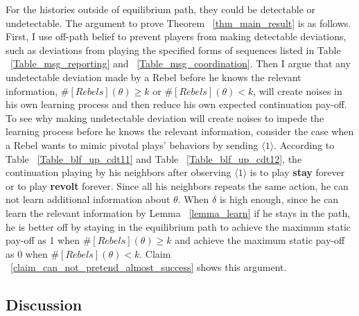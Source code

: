 \documentclass[12pt,letterpaper]{article}
\theoremstyle{definition}
\theoremstyle{remark}
\theoremstyle{claim}
\begin{document}
For the histories outside of equilibrium path, they could be detectable or undetectable. The argument to prove Theorem ~\ref{thm_main_result} is as follows. First, I use off-path belief to prevent players from making detectable deviations, such as deviations from playing the specified forms of sequences listed in Table ~\ref{Table_msg_reporting} and ~\ref{Table_msg_coordination}. Then I argue that any undetectable deviation made by a Rebel before he knows the relevant information, $\#[Rebels](\theta)\geq k$ or $\#[Rebels](\theta)< k$, will create noises in his own learning process and then reduce his own expected continuation pay-off.  To see why making undetectable deviation will create noises to impede the learning process before he knows the relevant information, consider the case when a Rebel wants to mimic pivotal plays' behaviors by sending $\langle 1 \rangle$. According to Table ~\ref{Table_blf_up_cdt11} and Table ~\ref{Table_blf_up_cdt12}, the continuation playing by his neighbors after observing $\langle 1 \rangle$ is to play \textbf{stay} forever or to play \textbf{revolt} forever. Since all his neighbors repeats the same action, he can not learn additional information about $\theta$. When $\delta$ is high enough, since he can learn the relevant information by Lemma ~\ref{lemma_learn} if he stays in the path, he is better off by staying in the equilibrium path to achieve the maximum static pay-off as 1 when $\#[Rebels](\theta)\geq k$ and achieve the maximum static pay-off as 0 when $\#[Rebels](\theta)< k$. Claim ~\ref{claim_can_not_pretend_almost_success} shows this argument.

\subsection{Discussion}
\label{sec:varies}
\end{document}
